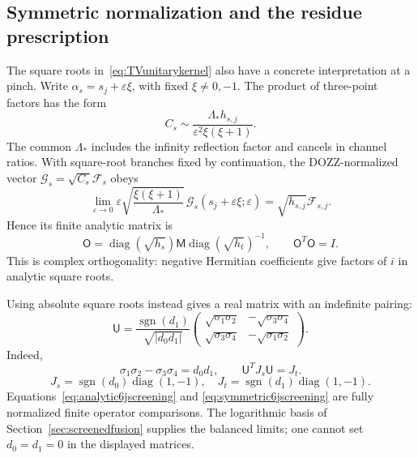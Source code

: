 \documentclass[11pt,a4paper]{article}
\numberwithin{equation}{section}
\theoremstyle{definition}
\theoremstyle{remark}
\DeclareMathOperator{\diag}{diag}
\begin{document}
\subsection{Symmetric normalization and the residue prescription}

The square roots in~\eqref{eq:TVunitarykernel} also have a
concrete interpretation at a pinch. Write
$\alpha_s=s_j+\varepsilon\xi$, with fixed
$\xi\ne0,-1$. The product of three-point factors has the form
\[
 C_s\sim\frac{\Lambda_*h_{s,j}}
                {\varepsilon^2\xi(\xi+1)}.
\]
The common $\Lambda_*$ includes the infinity reflection factor
and cancels in channel ratios. With square-root branches fixed
by continuation, the DOZZ-normalized vector
$\mathcal G_s=\sqrt{C_s}\mathcal F_s$ obeys
\begin{equation}
 \lim_{\varepsilon\to0}
 \varepsilon\sqrt{\frac{\xi(\xi+1)}{\Lambda_*}}\,
 \mathcal G_s(s_j+\varepsilon\xi;\varepsilon)
       =\sqrt{h_{s,j}}\mathcal F_{s,j}.
 \label{eq:regularizedTVvector}
\end{equation}
Hence its finite analytic matrix is
\[
 \mathsf O=\diag(\sqrt{h_s})\mathsf M
                 \diag(\sqrt{h_t})^{-1},
 \qquad \mathsf O^T\mathsf O=I.
\]
This is complex orthogonality: negative Hermitian coefficients
give factors of $i$ in analytic square roots.

Using absolute square roots instead gives a real matrix with
an indefinite pairing:
\begin{equation}
 \boxed{\quad
 \mathsf U=
 \frac{\operatorname{sgn}(d_1)}{\sqrt{|d_0d_1|}}
 \begin{pmatrix}
 \sqrt{\sigma_1\sigma_2}&-\sqrt{\sigma_3\sigma_4}\\
 \sqrt{\sigma_3\sigma_4}&-\sqrt{\sigma_1\sigma_2}
 \end{pmatrix}.
 \quad}
 \label{eq:symmetric6jscreening}
\end{equation}
Indeed,
\[
 \sigma_1\sigma_2-\sigma_3\sigma_4=d_0d_1,\qquad
 \mathsf U^T J_s\mathsf U=J_t.
\]
\[
 J_s=\operatorname{sgn}(d_0)\diag(1,-1),\quad
 J_t=\operatorname{sgn}(d_1)\diag(1,-1).
\]
Equations~\eqref{eq:analytic6jscreening} and
\eqref{eq:symmetric6jscreening} are fully normalized finite
operator comparisons. The logarithmic basis of
Section~\ref{sec:screenedfusion} supplies the balanced limits;
one cannot set $d_0=d_1=0$ in the displayed matrices.
\end{document}
